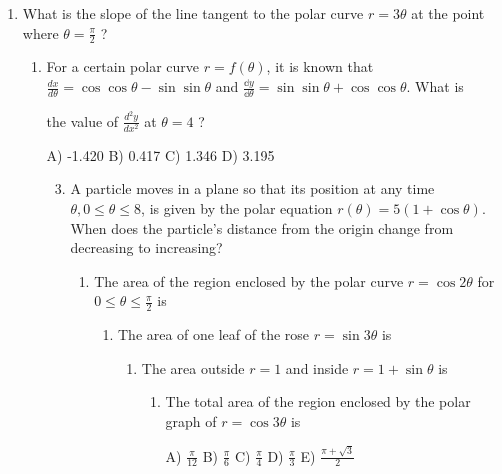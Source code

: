 \documentclass[10pt]{article}
\begin{document}
\begin{enumerate}
  \item What is the slope of the line tangent to the polar curve $r=3 \theta$ at the point where $\theta=\frac{\pi}{2}$ ?
		\begin{enumerate}
	A) $-\frac{\pi}{2}$
B) $-\frac{2}{\pi}$
C) 0
D) 3

  \item For a certain polar curve $r=f(\theta)$, it is known that $\frac{d x}{d \theta}=\cos \cos \theta-\sin \sin \theta$ and $\frac{\mathbb{d} y}{\mathbb{d} \theta}=\sin \sin \theta+\cos \cos \theta$. What is

the value of $\frac{d^{2} y}{d x^{2}}$ at $\theta=4$ ?
		\begin{enumerate}
A) -1.420
B) 0.417
C) 1.346
D) 3.195

\begin{enumerate}
  \setcounter{enumi}{2}
  \item A particle moves in a plane so that its position at any time $\theta, 0 \leq \theta \leq 8$, is given by the polar equation $r(\theta)=5(1+\cos \theta)$. When does the particle's distance from the origin change from decreasing to increasing?
		\begin{enumerate}
	A) $\theta=0$ only
B) $\theta=\pi$ only
C) $\theta=2 \pi$ only
D) $\theta=0$ and $\theta=\pi$
E) $\theta=\pi$ and $\theta=2 \pi$

  \item The area of the region enclosed by the polar curve $r=\cos 2 \theta$ for $0 \leq \theta \leq \frac{\pi}{2}$ is
		\begin{enumerate}
	A) $\frac{\pi}{2}$
B) $\pi$
C) $\frac{\pi}{8}$
D) $\frac{\pi}{4}$
E) 1

  \item The area of one leaf of the rose $r=\sin 3 \theta$ is
		\begin{enumerate}
	A) $\frac{\pi}{12}$
B) $\frac{\pi}{6}$
C) $\frac{\pi}{4}$
D) $\frac{\pi}{3}$
E) $\frac{\pi}{2}$

  \item The area outside $r=1$ and inside $r=1+\sin \theta$ is
		\begin{enumerate}
	A) $2+\pi$
B) $2+\frac{\pi}{2}$
C) $2+\frac{\pi}{4}$
D) $2-\frac{\pi}{4}$
E) $2-\frac{\pi}{2}$

  \item The total area of the region enclosed by the polar graph of $r=\cos 3 \theta$ is
		\begin{enumerate}
	A) $\frac{\pi}{12}$
B) $\frac{\pi}{6}$
C) $\frac{\pi}{4}$
D) $\frac{\pi}{3}$
E) $\frac{\pi+\sqrt{3}}{2}$


\end{enumerate}
\end{enumerate}
\end{enumerate}
\end{enumerate}
\end{enumerate}
\end{enumerate}
\end{enumerate}
\end{enumerate}
\end{enumerate}
\end{document}
